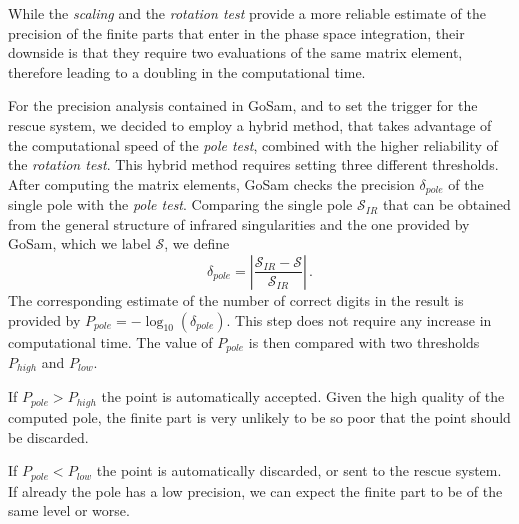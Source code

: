 \documentclass[11pt,a4paper]{refrep}
\newcommand{\gosamversion}{{2{.}0}}
\newcommand{\gosamv}[1][\gosamversion]{{\sc GoSam}\xspace}
\def\N{\mathcal{N}}
\def\S{\mathcal{S}}
\newcommand{\be}{\begin{equation}}
\newcommand{\ee}{\end{equation}}
\begin{document}
While  the {\it scaling} and the {\it rotation test} provide a more reliable estimate of the precision of the finite parts that enter in the phase space integration, their downside is that they require two evaluations of the same matrix element, therefore leading to a doubling in the computational time.


For the precision analysis contained in \gosamv, and to set the trigger for the rescue system, we decided to employ  a hybrid method, that takes advantage of the computational speed of the {\it pole test}, combined with the higher reliability of the {\it rotation test}.  This hybrid method requires setting three different thresholds.
After computing the matrix elements, \gosamv{} checks the precision  $ \delta_{pole}$ of the single pole with the {\it pole test}. Comparing the single pole 
$\S_{IR}$ that can be obtained from the general structure of infrared singularities and the one provided by  \gosamv, which we label $\S$, we define  
\be \label{eq:exd}
\delta_{pole} = \left | \frac{ \S_{IR} - \S{} }{ \S_{IR}} \right |\, .
\ee
The corresponding estimate of the number of correct digits in the result is provided by  $P_{pole}= - \log_{10} (\delta_{pole})$. This step does not require any increase in computational time. The value of $ P_{pole}$ is then compared with two thresholds $ P_{high}$ and $ P_{low}$. 

If $P_{pole} >  P_{high}$ the point is automatically accepted. Given the high quality of the computed pole, the finite part is very unlikely to be so poor that the point should be discarded.

If $P_{pole} <  P_{low}$ the point is automatically discarded, or sent to the rescue system. If already the pole has a low precision, we can expect the finite part to be of the same level or worse.
 
\end{document}
